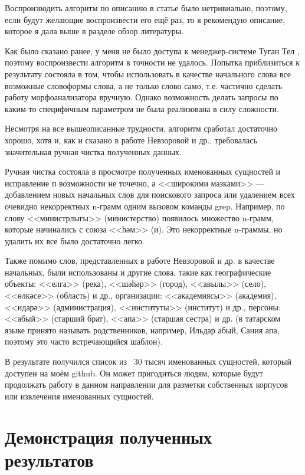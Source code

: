 
Воспроизводить алгоритм по описанию в статье было нетривиально, поэтому, если будут желающие воспроизвести его ещё раз, то я рекомендую описание, которое я дала выше в разделе обзор литературы.

Как было сказано ранее, у меня не было доступа к менеджер-системе Туган Тел \cite{tugan_tel}, поэтому воспроизвести алгоритм в точности не удалось. Попытка приблизиться к результату состояла в том, чтобы использовать в качестве начального слова все возможные словоформы слова, а не только слово само, т.е. частично сделать работу морфоанализатора вручную. Однако возможность делать запросы по каким-то специфичным параметром не была реализована в силу сложности.

Несмотря на все вышеописанные трудности, алгоритм сработал достаточно хорошо, хотя и, как и сказано в работе Невзоровой и др., требовалась значительная ручная чистка полученных данных.

Ручная чистка состояла в просмотре полученных именованных сущностей и исправление п возможности не точечно, а <<широкими мазками>> --- добавлением новых начальных слов для поискового запроса или удалением всех очевидно некорректных n-грамм одним вызовом команды grep. Например, по слову <<министрлыгы>> (министерство) появилось множество n-грамм, которые начинались с союза <<һәм>> (и). Это некорректные n-граммы, но удалить их все было достаточно легко. 

Также помимо слов, представленных в работе Невзоровой и др. в качестве начальных, были использованы и другие слова, такие как географические объекты: <<елга>> (река), <<шәһәр>> (город), <<авылы>> (село), <<өлкәсе>> (область) и др., организации:  <<академиясы>> (академия), <<идарә>> (администрация), <<институты>> (институт) и др., персоны: <<абый>> (старший брат), <<апа>> (старшая сестра) и др. (в татарском языке принято называть родственников, например, Ильдар абый, Сания апа, поэтому это часто встречающийся шаблон).

В результате получился список из ~30 тысяч именованных сущностей, который доступен на моём github. %
Он может пригодиться людям, которые будут продолжать работу в данном направлении для разметки собственных корпусов или извлечения именованных сущностей. 

\section{Демонстрация полученных результатов}

